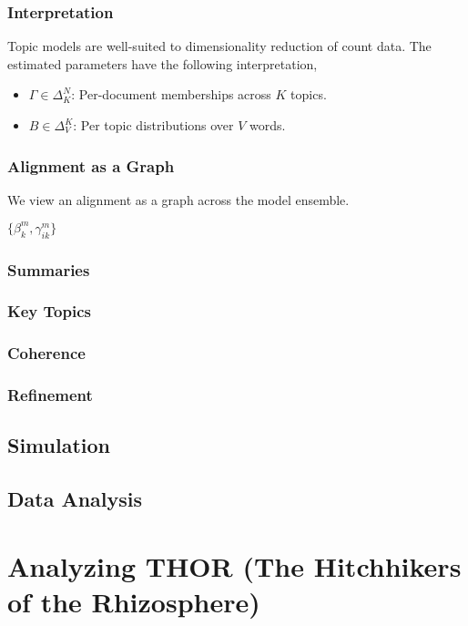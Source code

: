 \documentclass{beamer}
\begin{document}
\begin{frame}
  \frametitle{Interpretation}
Topic models are well-suited to dimensionality reduction of count data. The
estimated parameters have the following interpretation,
\begin{itemize}
  \item $\Gamma \in \Delta_{K}^{N}$: Per-document memberships across $K$ topics.
  \item $B \in \Delta_{V}^{K}$: Per topic distributions over $V$ words.
\end{itemize}
\end{frame}

\begin{frame}
  \frametitle{Alignment as a Graph}

  We view an alignment as a graph across the model ensemble.

  \begin{itemize}
    $\{\beta^m_{k}, \gamma^m_{ik}\}$
  \end{itemize}

\end{frame}

\begin{frame}
  \frametitle{Summaries}
\end{frame}

\begin{frame}
  \frametitle{Key Topics}
\end{frame}


\begin{frame}
  \frametitle{Coherence}
\end{frame}

\begin{frame}
  \frametitle{Refinement}
\end{frame}

\subsection{Simulation}

\begin{frame}
\end{frame}

\subsection{Data Analysis}

\section{Analyzing THOR (The Hitchhikers of the Rhizosphere)}
\end{document}
